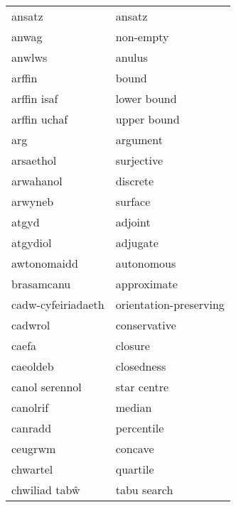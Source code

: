 \begin{supertabular}{p{0.22\textwidth}p{0.22\textwidth}}
                          ansatz &                            ansatz \\
                           anwag &                         non-empty \\
                          anwlws &                            anulus \\
                          arffin &                             bound \\
                     arffin isaf &                       lower bound \\
                    arffin uchaf &                       upper bound \\
                             arg &                          argument \\
                       arsaethol &                        surjective \\
                       arwahanol &                          discrete \\
                         arwyneb &                           surface \\
                           atgyd &                           adjoint \\
                        atgydiol &                          adjugate \\
                     awtonomaidd &                        autonomous \\
                      brasamcanu &                       approximate \\
              cadw-cyfeiriadaeth &            orientation-preserving \\
                         cadwrol &                      conservative \\
                           caefa &                           closure \\
                        caeoldeb &                        closedness \\
                  canol serennol &                       star centre \\
                        canolrif &                            median \\
                         canradd &                        percentile \\
                         ceugrwm &                           concave \\
                        chwartel &                          quartile \\
                   chwiliad tabŵ &                       tabu search \\

\end{supertabular}

